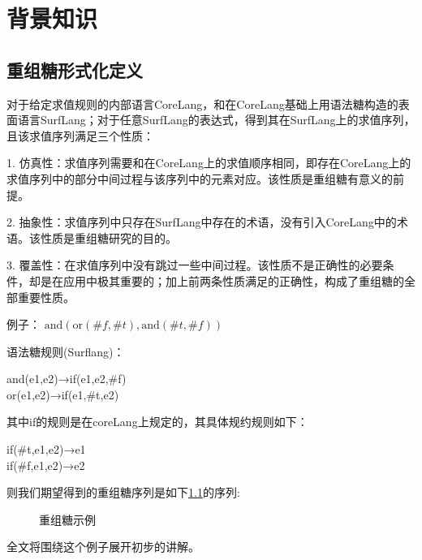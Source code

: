 \pagestyle{fancy}
\normalsize
\linespread{1.5}\selectfont
\label{mark:chapter2}\chapter{背景知识}

\section{重组糖形式化定义}
\label{mark:resugaring}对于给定求值规则的内部语言CoreLang，和在CoreLang基础上用语法糖构造的表面语言SurfLang；对于任意SurfLang的表达式，得到其在SurfLang上的求值序列，且该求值序列满足三个性质\label{mark:three}：

1.	仿真性：求值序列需要和在CoreLang上的求值顺序相同，即存在CoreLang上的求值序列中的部分中间过程与该序列中的元素对应。该性质是重组糖有意义的前提。

2.	抽象性：求值序列中只存在SurfLang中存在的术语，没有引入CoreLang中的术语。该性质是重组糖研究的目的。

3.	覆盖性：在求值序列中没有跳过一些中间过程。该性质不是正确性的必要条件，却是在应用中极其重要的；加上前两条性质满足的正确性，构成了重组糖的全部重要性质。

例子：
$\mbox{and}(\mbox{or}(\#f,\#t),\mbox{and}(\#t,\#f))$

语法糖规则(Surflang)：
\begin{center}
	\parbox[t]{\textwidth}{%
		\begin{center}  
			and(e1,e2)→if(e1,e2,\#f)\\
			or(e1,e2)→if(e1,\#t,e2)
		\end{center}  
	}%
\end{center}



其中if的规则是在coreLang上规定的，其具体规约规则如下：
\begin{center}
	\parbox[t]{\textwidth}{%
		\begin{center}  
			if(\#t,e1,e2)→e1\\
			if(\#f,e1,e2)→e2
		\end{center}  
	}%
\end{center}
 

则我们期望得到的重组糖序列是如下\ref{fig:example}的序列:

\begin{figure}[ht]
	
\caption{重组糖示例}
\label{fig:example}
\end{figure}
全文将围绕这个例子展开初步的讲解。

